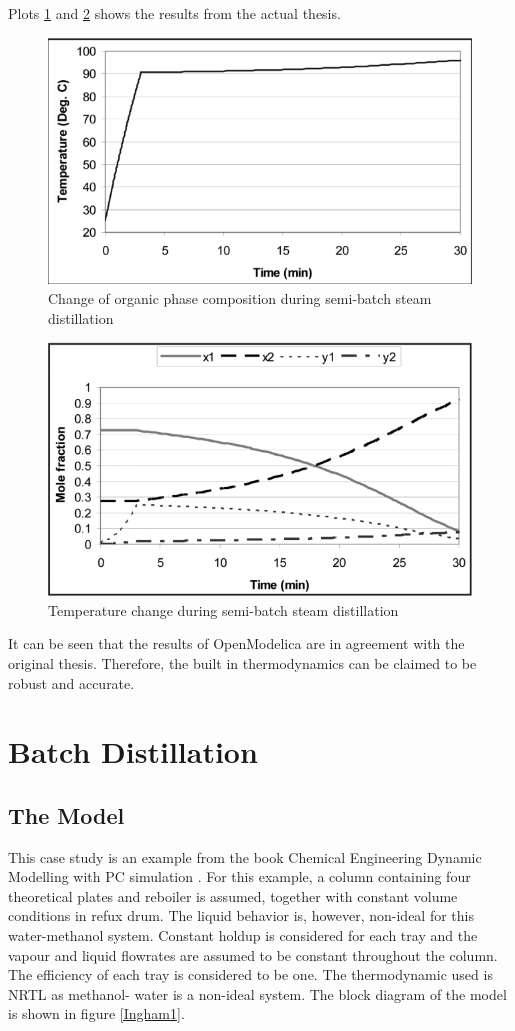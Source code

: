\documentclass[12pt]{report}
\begin{document}
Plots \ref{SD3} and \ref{SD4} shows the results from the actual thesis.
\begin{figure}
\centering
\includegraphics[width=0.7\linewidth]{SD3}
\caption{Change of organic phase composition during semi-batch steam distillation \cite{PHD}}
\label{SD3}
\end{figure}
\begin{figure}
\centering
\includegraphics[width=0.7\linewidth]{SD4}
\caption{Temperature change during semi-batch steam distillation \cite{PHD}}
\label{SD4}
\end{figure}

It can be seen that the results of OpenModelica are in agreement with the original thesis. Therefore, the built in thermodynamics can be claimed to be robust and accurate.

\section{Batch Distillation}
\subsection{The Model}
This case study is an example from the book Chemical Engineering Dynamic Modelling with PC simulation \cite{ingham}. For this example, a column containing four theoretical plates and reboiler is assumed, together with constant volume conditions in refux drum. The liquid behavior is, however, non-ideal for this water-methanol system. Constant holdup is considered for each tray and the vapour and liquid flowrates are assumed to be constant throughout the column. The efficiency of each tray is considered to be one. The thermodynamic used is NRTL as methanol- water is a non-ideal system. The block diagram of the model is shown in figure \ref{Ingham1}.
\end{document}
